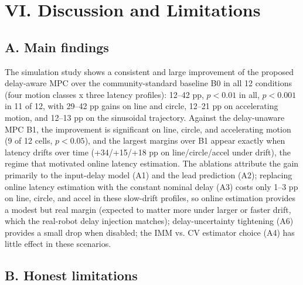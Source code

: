 \documentclass[journal]{IEEEtran}
\begin{document}
\section*{VI. Discussion and Limitations}

\subsection*{A. Main findings}

The simulation study shows a consistent and large improvement of the proposed delay-aware MPC over the community-standard baseline B0 in all 12 conditions (four motion classes x three latency profiles): 12--42 pp, $p<0.01$ in all, $p<0.001$ in 11 of 12, with 29--42 pp gains on line and circle, 12--21 pp on accelerating motion, and 12--13 pp on the sinusoidal trajectory. Against the delay-unaware MPC B1, the improvement is significant on line, circle, and accelerating motion (9 of 12 cells, $p<0.05$), and the largest margins over B1 appear exactly when latency drifts over time (+34/+15/+18 pp on line/circle/accel under drift), the regime that motivated online latency estimation. The ablations attribute the gain primarily to the input-delay model (A1) and the lead prediction (A2); replacing online latency estimation with the constant nominal delay (A3) costs only 1--3 pp on line, circle, and accel in these slow-drift profiles, so online estimation provides a modest but real margin (expected to matter more under larger or faster drift, which the real-robot delay injection matches); delay-uncertainty tightening (A6) provides a small drop when disabled; the IMM vs. CV estimator choice (A4) has little effect in these scenarios.

\subsection*{B. Honest limitations}
\end{document}
